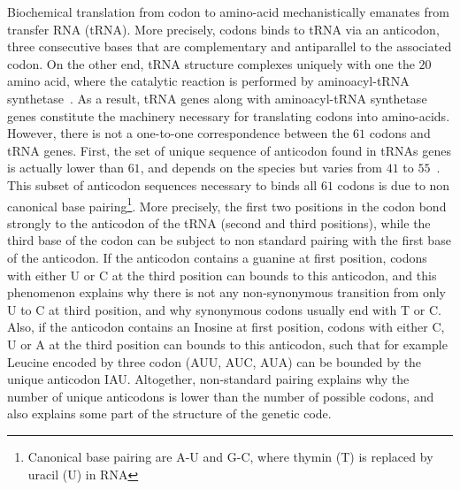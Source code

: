 Biochemical translation from \gls{codon} to amino-acid mechanistically emanates from transfer \acrshort{RNA} (\acrshort{tRNA}).
More precisely, \glspl{codon} binds to \acrshort{tRNA} via an anticodon, three consecutive bases that are complementary and antiparallel to the associated \gls{codon}.
On the other end, \acrshort{tRNA} structure complexes uniquely with one the $20$ amino acid, where the catalytic reaction is performed by aminoacyl-tRNA synthetase~\citep{Rich1976}.
As a result, \acrshort{tRNA} genes along with aminoacyl-tRNA synthetase genes constitute the machinery necessary for translating \glspl{codon} into amino-acids.
However, there is not a one-to-one correspondence between the $61$ \glspl{codon} and \acrshort{tRNA} genes.
First, the set of unique sequence of anticodon found in tRNAs genes is actually lower than $61$, and depends on the species but varies from $41$ to $55$~\citep{Goodenbour2006}.
This subset of anticodon sequences necessary to binds all $61$ \glspl{codon} is due to non canonical base pairing\footnote{Canonical base pairing are A-U and G-C, where thymin (T) is replaced by uracil (U) in RNA}.
More precisely, the first two positions in the \gls{codon} bond strongly to the anticodon of the \acrshort{tRNA} (second and third positions), while the third base of the \gls{codon} can be subject to non standard pairing with the first base of the anticodon.
If the anticodon contains a guanine at first position, \glspl{codon} with either U or C at the third position can bounds to this anticodon, and this phenomenon explains why there is not any non-synonymous {transition} from only U to C at third position, and why synonymous \glspl{codon} usually end with T or C.
Also, if the anticodon contains an Inosine at first position, \glspl{codon} with either C, U or A at the third position can bounds to this anticodon, such that for example Leucine encoded by three \gls{codon} (AUU, AUC, AUA) can be bounded by the unique anticodon IAU.
Altogether, non-standard pairing explains why the number of unique anticodons is lower than the number of possible \glspl{codon}, and also explains some part of the structure of the genetic code.

